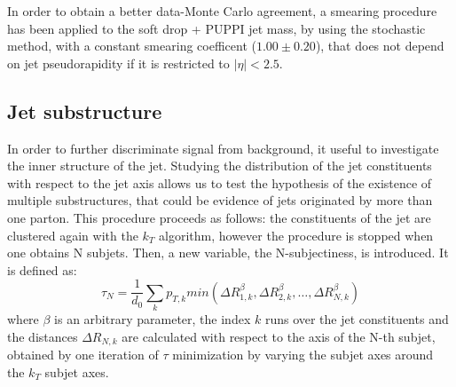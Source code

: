\noindent In order to obtain a better data-Monte Carlo agreement, a smearing procedure has been applied to the soft drop + PUPPI jet mass, by using the stochastic method, with a constant smearing coefficent ($1.00 \pm 0.20$), that does not depend on jet pseudorapidity if it is restricted to $|\eta|<2.5$.

\subsection{Jet substructure}\label{ssec:jetsub}

In order to further discriminate signal from background, it useful to investigate the inner structure of the jet. Studying the distribution of the jet constituents with respect to the jet axis allows us to test the hypothesis of the existence of multiple substructures, that could be evidence of jets originated by more than one parton. This procedure proceeds as follows: the constituents of the jet are clustered again with the $k_T$ algorithm, however the procedure is stopped when one obtains N subjets. 
Then, a new variable, the N-subjectiness, is introduced. It is defined as:
$$\tau_N = \frac{1}{d_0} \sum_k p_{T,k} min( \Delta R_{1,k}^\beta, \Delta R_{2,k}^\beta, \dots, \Delta R_{N,k}^\beta )$$
where $\beta$ is an arbitrary parameter, the index $k$ runs over the jet constituents and the distances $\Delta R_{N,k}$ are calculated with respect to the axis of the N-th subjet, obtained by one iteration of $\tau$ minimization by varying the subjet axes around the $k_T$ subjet axes.

